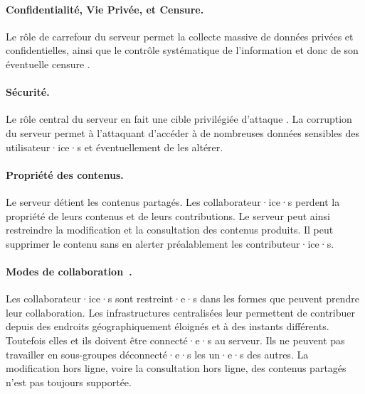 
\paragraph{Confidentialité, Vie Privée, et Censure.}
Le rôle de carrefour du serveur permet la collecte massive de données privées et confidentielles, ainsi que le contrôle systématique de l'information et donc de son éventuelle censure \autocite{jard2016_langage}.

\paragraph{Sécurité.}
Le rôle central du serveur en fait une cible privilégiée d'attaque \autocite{jard2016_langage}.
La corruption du serveur permet à l'attaquant d'accéder à de nombreuses données sensibles des utilisateur·ice·s et éventuellement de les altérer.

\paragraph{Propriété des contenus.}
Le serveur détient les contenus partagés.
Les collaborateur·ice·s perdent la propriété de leurs contenus et de leurs contributions.
Le serveur peut ainsi restreindre la modification et la consultation des contenus produits.
Il peut supprimer le contenu sans en alerter préalablement les contributeur·ice·s.

\paragraph{Modes de collaboration~\autocite{dourish_1995_divergence}.}
Les collaborateur·ice·s sont restreint·e·s dans les formes que peuvent prendre leur collaboration.
Les infrastructures centralisées leur permettent de contribuer depuis des endroits géographiquement éloignés et à des instants différents.
Toutefois elles et ils doivent être connecté·e·s au serveur.
Ils ne peuvent pas travailler en sous-groupes déconnecté·e·s les un·e·s des autres.
La modification hors ligne, voire la consultation hors ligne, des contenus partagés n'est pas toujours supportée.

